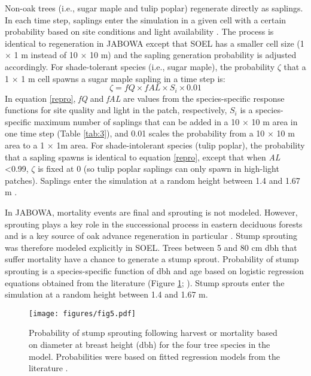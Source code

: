 \documentclass[
11pt, %
a4paper, %
oneside, %
headinclude,footinclude, %
]{scrartcl}
\begin{document}
Non-oak trees (i.e., sugar maple and tulip poplar) regenerate directly as saplings. In each time step, saplings enter the simulation in a given cell with a certain probability based on site conditions and light availability \citep{Botkin1993}. The process is identical to regeneration in JABOWA except that SOEL has a smaller cell size (1 $\times$ 1 m instead of 10 $\times$ 10 m) and the sapling generation probability is adjusted accordingly. For shade-tolerant species (i.e., sugar maple), the probability $\zeta$ that a 1 $\times$ 1 m cell spawns a sugar maple sapling in a time step is:
\begin{equation}\label{repro}
\zeta = fQ \times fAL \times S_i \times 0.01
\end{equation}
In equation \ref{repro}, \textit{fQ} and \textit{fAL} are values from the species-specific response functions for site quality and light in the patch, respectively, $S_i$ is a species-specific maximum number of saplings that can be added in a 10 $\times$ 10 m area in one time step (Table \ref{tab:3}), and 0.01 scales the probability from a 10 $\times$ 10 m area to a 1 $\times$ 1m area. For shade-intolerant species (tulip poplar), the probability that a sapling spawns is identical to equation \ref{repro}, except that when \textit{AL} \textless 0.99, $\zeta$ is fixed at 0 (so tulip poplar saplings can only spawn in high-light patches). Saplings enter the simulation at a random height between 1.4 and 1.67 m \citep{Botkin1993}.

In JABOWA, mortality events are final and sprouting is not modeled. However, sprouting plays a key role in the successional process in eastern deciduous forests and is a key source of oak advance regeneration in particular \citep{Johnson2009}. Stump sprouting was therefore modeled explicitly in SOEL. Trees between 5 and 80 cm dbh that suffer mortality have a chance to generate a stump sprout. Probability of stump sprouting is a species-specific function of dbh and age based on logistic regression equations obtained from the literature (Figure \ref{fig:5}; \citep{True1953, Wendel1975, Beck1981, MacDonald1983, Weigel2002}). Stump sprouts enter the simulation at a random height between 1.4 and 1.67 m. 

\begin{figure}
	\centering
	\texttt{[image: figures/fig5.pdf]}
	\caption{Probability of stump sprouting following harvest or mortality based on diameter at breast height (dbh) for the four tree species in the model. Probabilities were based on fitted regression models from the literature \citep{True1953, Wendel1975, Beck1981, MacDonald1983, Weigel2002}.  }
	\label{fig:5}
\end{figure}
\end{document}
